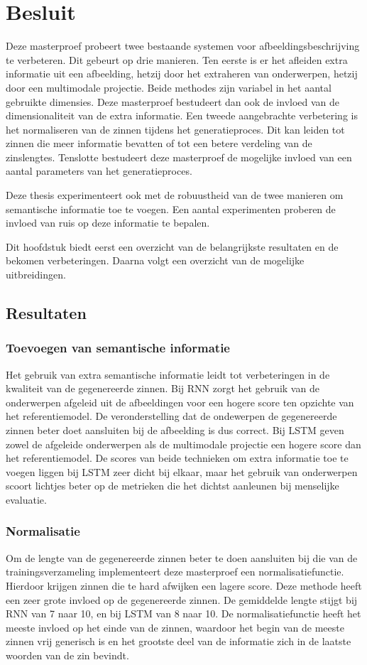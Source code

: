 \chapter{Besluit}
\label{besluit}
Deze masterproef probeert twee bestaande systemen voor afbeeldingsbeschrijving te verbeteren. Dit gebeurt op drie manieren. Ten eerste is er het afleiden extra informatie uit een afbeelding, hetzij door het extraheren van onderwerpen, hetzij door een multimodale projectie. Beide methodes zijn variabel in het aantal gebruikte dimensies. Deze masterproef bestudeert dan ook de invloed van de dimensionaliteit van de extra informatie. 
Een tweede aangebrachte verbetering is het normaliseren van de zinnen tijdens het generatieproces. Dit kan leiden tot zinnen die meer informatie bevatten of tot een betere verdeling van de zinslengtes. Tenslotte bestudeert deze masterproef de mogelijke invloed van een aantal parameters van het generatieproces.

Deze thesis experimenteert ook met de robuustheid van de twee manieren om semantische informatie toe te voegen. Een aantal experimenten proberen de invloed van ruis op deze informatie te bepalen.

Dit hoofdstuk biedt eerst een overzicht van de belangrijkste resultaten en de bekomen verbeteringen. Daarna volgt een overzicht van de mogelijke uitbreidingen.
\section{Resultaten}
\subsection{Toevoegen van semantische informatie}
Het gebruik van extra semantische informatie leidt tot verbeteringen in de kwaliteit van de gegenereerde zinnen. 
Bij RNN zorgt het gebruik van de onderwerpen afgeleid uit de afbeeldingen voor een hogere score ten opzichte van het referentiemodel. 
De veronderstelling dat de ondewerpen de gegenereerde zinnen beter doet aansluiten bij de afbeelding is dus correct.
Bij LSTM geven zowel de afgeleide onderwerpen als de multimodale projectie een hogere score dan het referentiemodel. 
De scores van beide technieken om extra informatie toe te voegen liggen bij LSTM zeer dicht bij elkaar, maar het gebruik van onderwerpen scoort lichtjes beter op de metrieken die het dichtst aanleunen bij menselijke evaluatie.


\subsection{Normalisatie}
Om de lengte van de gegenereerde zinnen beter te doen aansluiten bij die van de trainingsverzameling implementeert deze masterproef een normalisatiefunctie. Hierdoor krijgen zinnen die te hard afwijken een lagere score. 
Deze methode heeft een zeer grote invloed op de gegenereerde zinnen. De gemiddelde lengte stijgt bij RNN van 7 naar 10, en bij LSTM van 8 naar 10. De normalisatiefunctie heeft het meeste invloed op het einde van de zinnen, waardoor het begin van de meeste zinnen vrij generisch is en het grootste deel van de informatie zich in de laatste woorden van de zin bevindt.

